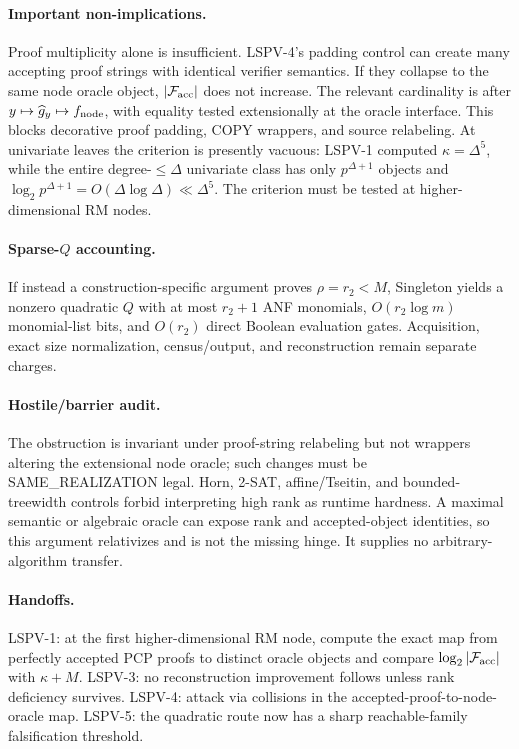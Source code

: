 \documentclass[11pt]{article}
\begin{document}
\paragraph{Important non-implications.} Proof multiplicity alone is insufficient. LSPV-4's padding control can create many accepting proof strings with identical verifier semantics. If they collapse to the same node oracle object, \(|\mathcal F_{\rm acc}|\) does not increase. The relevant cardinality is after \(y\mapsto\widehat g_y\mapsto f_{\rm node}\), with equality tested extensionally at the oracle interface. This blocks decorative proof padding, COPY wrappers, and source relabeling.
At univariate leaves the criterion is presently vacuous: LSPV-1 computed \(\kappa=\Delta^5\), while the entire degree-\(\le\Delta\) univariate class has only \(p^{\Delta+1}\) objects and \(\log_2p^{\Delta+1}=O(\Delta\log\Delta)\ll\Delta^5\). The criterion must be tested at higher-dimensional RM nodes.
\paragraph{Sparse-\(Q\) accounting.} If instead a construction-specific argument proves \(\rho=r_2<M\), Singleton yields a nonzero quadratic \(Q\) with at most \(r_2+1\) ANF monomials, \(O(r_2\log m)\) monomial-list bits, and \(O(r_2)\) direct Boolean evaluation gates. Acquisition, exact size normalization, census/output, and reconstruction remain separate charges.
\paragraph{Hostile/barrier audit.} The obstruction is invariant under proof-string relabeling but not wrappers altering the extensional node oracle; such changes must be SAME\_REALIZATION legal. Horn, 2-SAT, affine/Tseitin, and bounded-treewidth controls forbid interpreting high rank as runtime hardness. A maximal semantic or algebraic oracle can expose rank and accepted-object identities, so this argument relativizes and is not the missing hinge. It supplies no arbitrary-algorithm transfer.
\paragraph{Handoffs.} LSPV-1: at the first higher-dimensional RM node, compute the exact map from perfectly accepted PCP proofs to distinct oracle objects and compare \(\log_2|\mathcal F_{\rm acc}|\) with \(\kappa+M\). LSPV-3: no reconstruction improvement follows unless rank deficiency survives. LSPV-4: attack via collisions in the accepted-proof-to-node-oracle map. LSPV-5: the quadratic route now has a sharp reachable-family falsification threshold.
\end{document}
